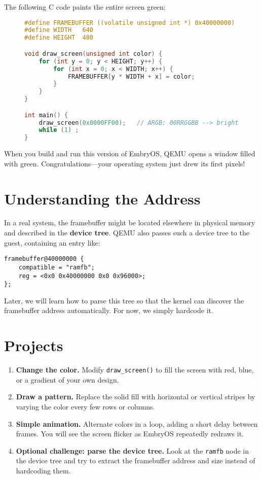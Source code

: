The following C code paints the entire screen green:

\begin{figure}[H]
\centering
\begin{minipage}{0.9\textwidth}
\begin{lstlisting}[style=oscode,language=C,caption={Drawing a solid color on the framebuffer},label={lst:framebuffer}]
#define FRAMEBUFFER ((volatile unsigned int *) 0x40000000)
#define WIDTH   640
#define HEIGHT  480

void draw_screen(unsigned int color) {
    for (int y = 0; y < HEIGHT; y++) {
        for (int x = 0; x < WIDTH; x++) {
            FRAMEBUFFER[y * WIDTH + x] = color;
        }
    }
}

int main() {
    draw_screen(0x0000FF00);   // ARGB: 00RRGGBB --> bright green
    while (1) ;
}
\end{lstlisting}
\end{minipage}
\end{figure}

When you build and run this version of EmbryOS, QEMU opens a window filled with
green.  Congratulations—your operating system just drew its first pixels!

\section{Understanding the Address}

In a real system, the framebuffer might be located elsewhere in physical memory
and described in the \textbf{device tree}.  QEMU also passes such a device tree
to the guest, containing an entry like:

\begin{lstlisting}[style=oscode,language={}]
framebuffer@40000000 {
    compatible = "ramfb";
    reg = <0x0 0x40000000 0x0 0x96000>;
};
\end{lstlisting}

Later, we will learn how to parse this tree so that the kernel can discover the
framebuffer address automatically.  For now, we simply hardcode it.

\section{Projects}

\begin{enumerate}
  \item \textbf{Change the color.}  
        Modify \texttt{draw\_screen()} to fill the screen with red, blue, or a
        gradient of your own design.
  \item \textbf{Draw a pattern.}  
        Replace the solid fill with horizontal or vertical stripes by varying
        the color every few rows or columns.
  \item \textbf{Simple animation.}  
        Alternate colors in a loop, adding a short delay between frames.  You
        will see the screen flicker as EmbryOS repeatedly redraws it.
  \item \textbf{Optional challenge: parse the device tree.}  
        Look at the \texttt{ramfb} node in the device tree and try to extract
        the framebuffer address and size instead of hardcoding them.
\end{enumerate}
